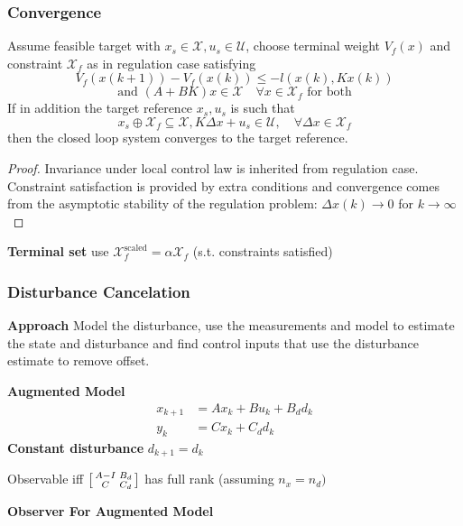 \subsubsection{Convergence}

Assume feasible target with
$x_s \in \mathcal{X}, u_s \in \mathcal{U}$,
choose terminal weight $V_f(x)$ and constraint $\mathcal{X}_f$
as in regulation case satisfying
\[
	V_f(x(k+1)) - V_f(x(k)) \leq -l(x(k), Kx(k))
\]
\[
	\text{and }
	(A+BK) x \in \mathcal{X} \quad \forall x \in \mathcal{X}_f
	\text{ for both}
\]
If in addition the target reference $x_s, u_s$ is such that
\[
	x_s \oplus \mathcal{X}_f \subseteq \mathcal{X}, K\Delta x + u_s \in \mathcal{U}, \quad \forall \Delta x \in \mathcal{X}_f
\]
then the closed loop system converges to the target reference.

\begin{proof}
	Invariance under local control law is inherited from regulation case.
	Constraint satisfaction is provided by extra conditions and
	convergence comes from the asymptotic stability of the regulation problem:
	$\Delta x(k)\rightarrow0$ for $k\rightarrow\infty$
\end{proof}

\textbf{Terminal set} use
$\mathcal{X}_f^{\text{scaled}} = \alpha \mathcal{X}_f$
(s.t. constraints satisfied)


\subsubsection{Disturbance Cancelation}


\textbf{Approach}
Model the disturbance,
use the measurements and model
to estimate the state and disturbance
and find control inputs that use
the disturbance estimate to remove offset.

\textbf{Augmented Model}
\begin{align*}
	x_{k+1} & = Ax_k + Bu_k + B_d d_k \\
	y_k     & = Cx_k + C_d d_k
\end{align*}
\textbf{Constant disturbance}
$d_{k+1}  = d_k$

Observable iff
$\begin{bsmallmatrix}
		A - I & B_d \\ C & C_d
	\end{bsmallmatrix}$
has full rank (assuming $n_x = n_d)$

\textbf{Observer For Augmented Model}

